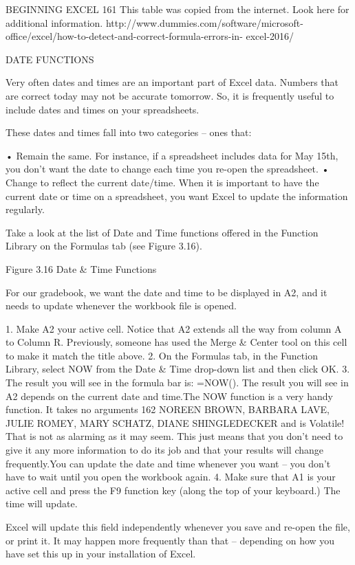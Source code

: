 BEGINNING EXCEL 161
This table was copied from the internet. Look here for additional information.
http://www.dummies.com/software/microsoft-office/excel/how-to-detect-and-correct-formula-errors-in-
excel-2016/

DATE FUNCTIONS

Very often dates and times are an important part of Excel data. Numbers that are correct today may
not be accurate tomorrow. So, it is frequently useful to include dates and times on your spreadsheets.

These dates and times fall into two categories – ones that:

• Remain the same. For instance, if a spreadsheet includes data for May 15th, you don’t want the
date to change each time you re-open the spreadsheet.
• Change to reflect the current date/time. When it is important to have the current date or time on
a spreadsheet, you want Excel to update the information regularly.

Take a look at the list of Date and Time functions offered in the Function Library on the Formulas tab
(see Figure 3.16).




Figure 3.16 Date & Time Functions


For our gradebook, we want the date and time to be displayed in A2, and it needs to update whenever
the workbook file is opened.

1. Make A2 your active cell. Notice that A2 extends all the way from column A to Column R.
Previously, someone has used the Merge & Center tool on this cell to make it match the title
above.
2. On the Formulas tab, in the Function Library, select NOW from the Date & Time drop-down
list and then click OK.
3. The result you will see in the formula bar is: =NOW(). The result you will see in A2 depends on
the current date and time.The NOW function is a very handy function. It takes no arguments
162 NOREEN BROWN, BARBARA LAVE, JULIE ROMEY, MARY SCHATZ, DIANE SHINGLEDECKER
and is Volatile! That is not as alarming as it may seem. This just means that you don’t need to
give it any more information to do its job and that your results will change frequently.You can
update the date and time whenever you want – you don’t have to wait until you open the
workbook again.
4. Make sure that A1 is your active cell and press the F9 function key (along the top of your
keyboard.) The time will update.

Excel will update this field independently whenever you save and re-open the file, or print it. It may
happen more frequently than that – depending on how you have set this up in your installation of
Excel.


